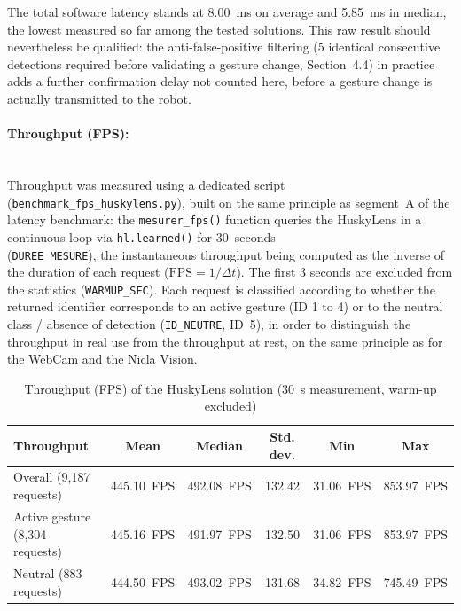 \documentclass[12pt,a4paper]{report}
\begin{document}
	The total software latency stands at 8.00~ms on average and 5.85~ms in median, the lowest measured so far among the tested solutions. This raw result should nevertheless be qualified: the anti-false-positive filtering (5 identical consecutive detections required before validating a gesture change, Section~4.4) in practice adds a further confirmation delay not counted here, before a gesture change is actually transmitted to the robot.
	
	\newpage
	
	
	\paragraph{Throughput (FPS):} \mbox{} \\
	Throughput was measured using a dedicated script (\texttt{benchmark\_fps\_huskylens.py}), built on the same principle as segment~A of the latency benchmark: the \texttt{mesurer\_fps()} function queries the HuskyLens in a continuous loop via \texttt{hl.learned()} for 30~seconds \\ (\texttt{DUREE\_MESURE}), the instantaneous throughput being computed as the inverse of the duration of each request ($\text{FPS} = 1/\Delta t$). The first 3 seconds are excluded from the statistics (\texttt{WARMUP\_SEC}). Each request is classified according to whether the returned identifier corresponds to an active gesture (ID 1 to 4) or to the neutral class / absence of detection (\texttt{ID\_NEUTRE}, ID~5), in order to distinguish the throughput in real use from the throughput at rest, on the same principle as for the WebCam and the Nicla Vision.
	
	\begin{table}[H]
		\centering
		\footnotesize\setlength{\tabcolsep}{4pt}
		\begin{tabular}{lccccc}
			\toprule
			\textbf{Throughput} & \textbf{Mean} & \textbf{Median} & \textbf{Std. dev.} & \textbf{Min} & \textbf{Max} \\
			\midrule
			Overall (9,187 requests) & 445.10~FPS & 492.08~FPS & 132.42 & 31.06~FPS & 853.97~FPS \\
			Active gesture (8,304 requests) & 445.16~FPS & 491.97~FPS & 132.50 & 31.06~FPS & 853.97~FPS \\
			Neutral (883 requests) & 444.50~FPS & 493.02~FPS & 131.68 & 34.82~FPS & 745.49~FPS \\
			\bottomrule
		\end{tabular}
		\caption{Throughput (FPS) of the HuskyLens solution (30~s measurement, warm-up excluded)}
		\label{tab:fps-husky}
	\end{table}
	
\end{document}
